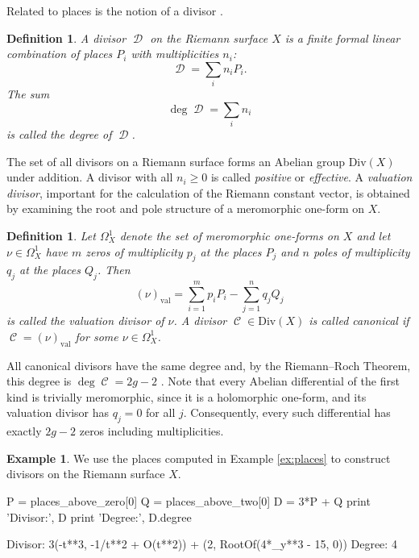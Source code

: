 \documentclass[12pt]{article}
\newtheorem{definition}[theorem]{Definition}
\theoremstyle{definition}
\newtheorem{example}[theorem]{Example}
\DeclareMathOperator{\DivC}{\mathcal{C}}
\DeclareMathOperator{\DivD}{\mathcal{D}}
\begin{document}
Related to places is the notion of a divisor
\cite{Griffiths89,Springer57}.
\begin{definition} \label{def:divisor}
A divisor $\DivD$ on the Riemann surface $X$ is a finite formal linear
combination of places $P_i$ with multiplicities $n_i$:
\begin{equation}
\DivD = \sum_i n_i P_i.
\end{equation}
The sum
\begin{equation}
\deg \DivD = \sum_i n_i
\end{equation}
is called the degree of $\DivD$.
\end{definition}
The set of all divisors on a Riemann surface forms an Abelian group
$\text{Div}(X)$ under addition. A divisor with all $n_i \geq 0$ is
called {\it positive} or {\it effective}. A {\it valuation divisor},
important for the calculation of the Riemann constant vector, is
obtained by examining the root and pole structure of a meromorphic
one-form on $X$.
\begin{definition} \label{def:valuationdivisor}
Let $\Omega_X^1$ denote the set of meromorphic one-forms on $X$ and let
$\nu \in \Omega_X^1$ have $m$ zeros of multiplicity $p_j$ at the places
$P_j$ and $n$ poles of multiplicity $q_j$ at the places $Q_j$. Then
\begin{equation} \label{eqn: valuation divisor}
  (\nu)_\text{val} = \sum_{i=1}^m p_iP_i - \sum_{j=1}^n q_jQ_j
\end{equation}
is called the valuation divisor of $\nu$. A divisor $\DivC \in
\text{Div}(X)$ is called {\it canonical} if $\DivC = (\nu)_\text{val}$
for some $\nu \in \Omega_X^1$.
\end{definition}
All canonical divisors have the same degree and, by the Riemann--Roch
Theorem, this degree is $\deg \DivC = 2g - 2$ \cite{Springer57}. Note
that every Abelian differential of the first kind is trivially
meromorphic, since it is a holomorphic one-form, and its valuation
divisor has $q_j = 0$ for all $j$. Consequently, every such differential
has exactly $2g-2$ zeros including multiplicities.


\begin{example} \label{ex:divisors} %
We use the places computed in Example \ref{ex:places} to construct
divisors on the Riemann surface $X$.
\begin{ipythoninput}
P = places_above_zero[0]
Q = places_above_two[0]
D = 3*P + Q
print 'Divisor:', D
print 'Degree:', D.degree
\end{ipythoninput}
\begin{ipythonoutput}
Divisor: 3(-t**3, -1/t**2 + O(t**2)) + (2, RootOf(4*_y**3 - 15, 0))
Degree: 4
\end{ipythonoutput}
\end{example}
\end{document}
